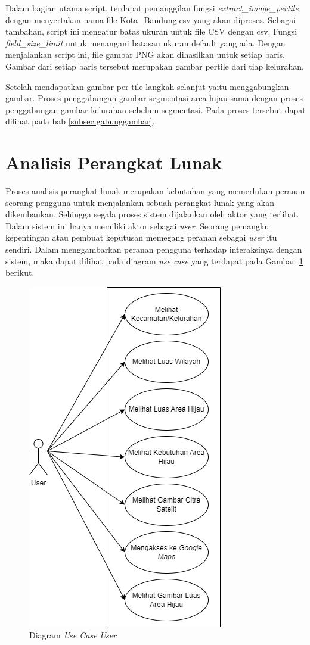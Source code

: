 Dalam bagian utama script, terdapat pemanggilan fungsi \textit{extract\_image\_pertile }dengan menyertakan nama file Kota\_Bandung.csv yang akan diproses. Sebagai tambahan, script ini mengatur batas ukuran untuk file CSV dengan csv. Fungsi \textit{field\_size\_limit} untuk menangani batasan ukuran default yang ada. Dengan menjalankan script ini, file gambar PNG akan dihasilkan untuk setiap baris. Gambar dari setiap baris tersebut merupakan gambar pertile dari tiap kelurahan.

Setelah mendapatkan gambar per tile langkah selanjut yaitu menggabungkan gambar. Proses penggabungan gambar segmentasi area hijau sama dengan proses penggabungan gambar kelurahan sebelum segmentasi. Pada proses tersebut dapat dilihat pada bab \ref{subsec:gabunggambar}.



\section{Analisis Perangkat Lunak}
Proses analisis perangkat lunak merupakan kebutuhan yang memerlukan peranan seorang pengguna untuk menjalankan sebuah perangkat lunak yang akan dikembankan. Sehingga segala proses sistem dijalankan oleh aktor yang terlibat. Dalam sistem ini hanya memiliki aktor sebagai \textit{user}. Seorang pemangku kepentingan atau pembuat keputusan memegang peranan sebagai \textit{user} itu sendiri. Dalam menggambarkan peranan pengguna terhadap interaksinya dengan sistem, maka dapat dilihat pada diagram \textit{use case} yang terdapat pada Gambar~\ref{fig:useCaseUser} berikut.

\begin{figure}[H]
	\centering
	\includegraphics[scale=0.5]{Gambar/UseCaseUser.png}
	\caption[Diagram \textit{Use Case} \textit{User}]{Diagram \textit{Use Case} \textit{User}}
	\label{fig:useCaseUser}
\end{figure}

